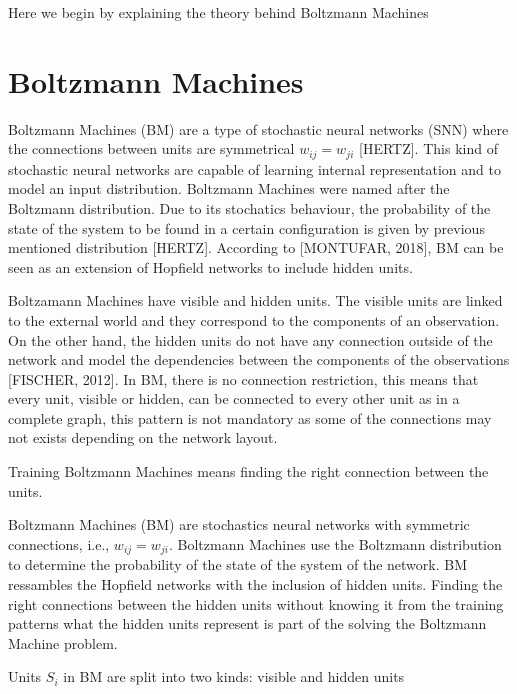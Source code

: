 Here we begin by explaining the theory behind Boltzmann Machines

\section{Boltzmann Machines}

Boltzmann Machines (BM) are a type of stochastic neural networks (SNN) where the connections between units are symmetrical $w_{ij} = w_{ji}$ [HERTZ]. This kind of stochastic neural networks are capable of learning internal representation and to model an input distribution. Boltzmann Machines were named after the Boltzmann distribution. Due to its stochatics behaviour, the probability of the state of the system to be found in a certain configuration is given by previous mentioned distribution [HERTZ]. According to [MONTUFAR, 2018], BM can be seen as an extension of Hopfield networks to include hidden units.


Boltzamann Machines have visible and hidden units. The visible units are linked to the external world and they correspond to the components of an observation. On the other hand, the hidden units do not have any connection outside of the network and model the dependencies between the components of the observations [FISCHER, 2012]. In BM, there is no connection restriction, this means that every unit, visible or hidden, can be connected to every other unit as in a complete graph, this pattern is not mandatory as some of the connections may not exists depending on the network layout.

Training Boltzmann Machines means finding the right connection between the units.


Boltzmann Machines (BM) are stochastics neural networks with symmetric connections, i.e., $w_{ij} = w_{ji}$. Boltzmann Machines use the Boltzmann distribution to determine the probability of the state of the system of the network. BM ressambles the Hopfield networks with the inclusion of hidden units. Finding the right connections between the hidden units without knowing it from the training patterns what the hidden units represent is part of the solving the Boltzmann Machine problem.

Units $S_{i}$ in BM are split into two kinds: visible and hidden units 
